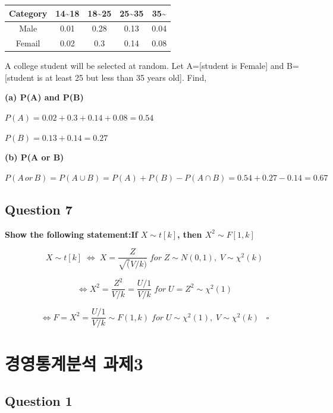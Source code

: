 \documentclass[
  letterpaper,
  DIV=11,
  numbers=noendperiod]{scrreprt}
\begin{document}
\begin{longtable}[]{@{}ccccc@{}}
\toprule\noalign{}
Category & 14\textasciitilde18 & 18\textasciitilde25 &
25\textasciitilde35 & 35\textasciitilde{} \\
\midrule\noalign{}
\endhead
\bottomrule\noalign{}
\endlastfoot
Male & 0.01 & 0.28 & 0.13 & 0.04 \\
Femail & 0.02 & 0.3 & 0.14 & 0.08 \\
\end{longtable}

A college student will be selected at random. Let A={[}student is
Female{]} and B={[}student is at least 25 but less than 35 years old{]}.
Find,

\textbf{(a) P(A) and P(B)}

\(P(A)=0.02+0.3+0.14+0.08=0.54\)

\(P(B)=0.13+0.14=0.27\)

\textbf{(b) P(A or B)}

\(P(A\,or\,B)=P(A\cup B)=P(A)+P(B)-P(A\cap B)=0.54+0.27-0.14=0.67\)

\section*{Question 7}\label{question-7}


\textbf{Show the following statement:If \(X\sim t[k]\), then
\(X^2\sim F[1,k]\)}

\[X\sim t[k]\;\Leftrightarrow\;X=\frac{Z}{\sqrt(V/k)}\;for\;Z\sim N(0,1),\;V\sim \chi^2(k)\]

\[\Leftrightarrow X^2=\frac{Z^2}{V/k}=\frac{U/1}{V/k}\;for\;U=Z^2\sim \chi^2(1)\]

\[\Leftrightarrow F=X^2=\frac{U/1}{V/k}\sim F(1,k)\;for\;U\sim\chi^2(1),\;V\sim\chi^2(k)\;\;\;\square\]

\chapter*{경영통계분석
과제3}\label{uxacbduxc601uxd1b5uxacc4uxbd84uxc11d-uxacfcuxc81c3}


\section*{Question 1}\label{question-1-2}
\end{document}
